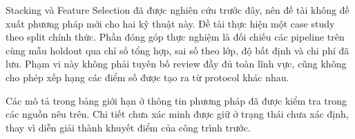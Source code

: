 Stacking và Feature Selection đã được nghiên cứu trước đây, nên đề tài không đề xuất phương pháp mới cho hai kỹ thuật này. Đề tài thực hiện một case study theo split chính thức. Phần đóng góp thực nghiệm là đối chiếu các pipeline trên cùng mẫu holdout qua chỉ số tổng hợp, sai số theo lớp, độ bất định và chi phí đã lưu. Phạm vi này không phải tuyên bố review đầy đủ toàn lĩnh vực, cũng không cho phép xếp hạng các điểm số được tạo ra từ protocol khác nhau.

Các mô tả trong bảng giới hạn ở thông tin phương pháp đã được kiểm tra trong các nguồn nêu trên. Chi tiết chưa xác minh được giữ ở trạng thái chưa xác định, thay vì diễn giải thành khuyết điểm của công trình trước.
